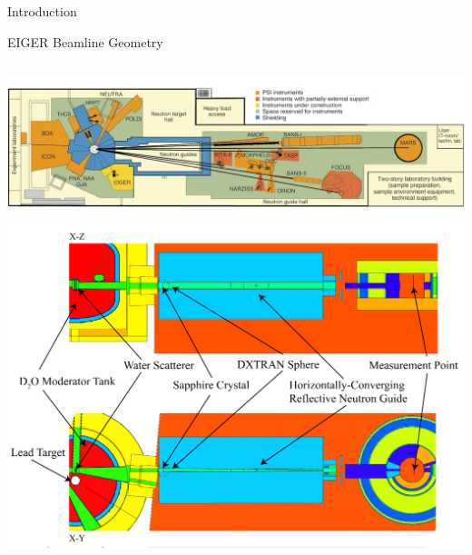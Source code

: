 \documentclass[final,t]{beamer}
\begin{document}
\begin{frame}{}
\begin{columns}[t]
\begin{column}{.3\linewidth}
\begin{block}{Introduction}


      \end{block}

      \begin{block}{EIGER Beamline Geometry}
      
        \begin{columns}[T]
          \begin{column}{.75\linewidth}
        
        \includegraphics*[width=\linewidth]{exp.jpg}

        \includegraphics*[width=\linewidth]{geom.pdf}
        

\end{column}
\end{columns}
\end{block}
\end{column}
\end{columns}
\end{frame}
\end{document}
